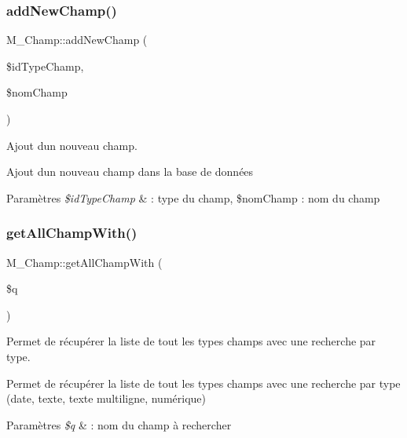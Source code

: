 \subsubsection{\texorpdfstring{add\+New\+Champ()}{addNewChamp()}}
{\footnotesize\ttfamily M\+\_\+\+Champ\+::add\+New\+Champ (\begin{DoxyParamCaption}\item[{}]{\$id\+Type\+Champ,  }\item[{}]{\$nom\+Champ }\end{DoxyParamCaption})}



Ajout d\textquotesingle{}un nouveau champ. 

Ajout d\textquotesingle{}un nouveau champ dans la base de données 
\begin{DoxyParams}{Paramètres}
{\em \$id\+Type\+Champ} & \+: type du champ, \$nom\+Champ \+: nom du champ \\
\hline
\end{DoxyParams}
\mbox{\label{class_m___champ_a62e1b1a0188829064f061b52decba9d3}} 
\subsubsection{\texorpdfstring{get\+All\+Champ\+With()}{getAllChampWith()}}
{\footnotesize\ttfamily M\+\_\+\+Champ\+::get\+All\+Champ\+With (\begin{DoxyParamCaption}\item[{}]{\$q }\end{DoxyParamCaption})}



Permet de récupérer la liste de tout les types champs avec une recherche par type. 

Permet de récupérer la liste de tout les types champs avec une recherche par type (date, texte, texte multiligne, numérique) 
\begin{DoxyParams}{Paramètres}
{\em \$q} & \+: nom du champ à rechercher \\
\hline
\end{DoxyParams}
\mbox{\label{class_m___champ_a456356fe964c5205fc9ff2023321d141}} 
